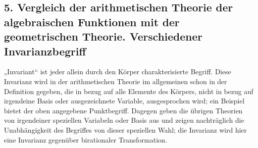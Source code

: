 \documentclass[11pt]{article}
\begin{document}
\subsection*{5. Vergleich der arithmetischen Theorie der algebraischen Funktionen mit der geometrischen Theorie. Verschiedener Invarianzbegriff}
„Invariant“ ist jeder allein durch den Körper charakterisierte Begriff. Diese Invarianz wird in der arithmetischen Theorie im allgemeinen schon in der Definition gegeben, die in bezug auf alle Elemente des Körpers, nicht in bezug auf irgendeine Basis oder ausgezeichnete Variable, ausgesprochen wird; ein Beispiel bietet der oben angegebene Punktbegriff. Dagegen geben die übrigen Theorien von irgendeiner speziellen Variabeln oder Basis aus und zeigen nachträglich die Unabhängigkeit des Begriffes von dieser speziellen Wahl; die Invarianz wird hier eine Invarianz gegenüber birationaler Transformation.
\end{document}

